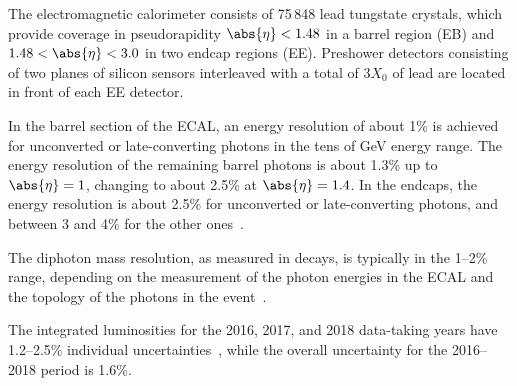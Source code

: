 





The electromagnetic calorimeter consists of 75\,848 lead tungstate crystals, which provide coverage in pseudorapidity $\abs{\eta} < 1.48 $ in a barrel region (EB)
and $1.48 < \abs{\eta} < 3.0$ in two endcap regions (EE). Preshower detectors consisting of two planes of silicon sensors interleaved with a total of $3 X_0$ of
lead are located in front of each EE detector.

In the barrel section of the ECAL, an energy resolution of about 1\% is achieved for unconverted or late-converting photons in the tens of GeV energy range.
The energy resolution of the remaining barrel photons is about 1.3\% up to $\abs{\eta} = 1$, changing to about 2.5\% at $\abs{\eta} = 1.4$. In the endcaps,
the energy resolution is about 2.5\% for unconverted or late-converting photons, and between 3 and 4\% for the other ones~\cite{CMS:2015myp}.

The diphoton mass resolution, as measured in \Htogg decays, is typically in the 1--2\% range, depending on the measurement of the photon
energies in the ECAL and the topology of the photons in the event~\cite{CMS:2020xrn}.

The integrated luminosities for the 2016, 2017, and 2018 data-taking years have 1.2--2.5\% individual uncertainties~\cite{CMS-LUM-17-003,CMS-PAS-LUM-17-004,CMS-PAS-LUM-18-002},
while the overall uncertainty for the 2016--2018 period is 1.6\%.
